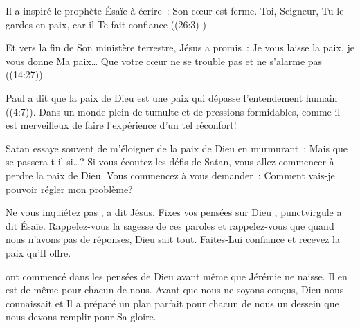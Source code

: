 Il a inspiré le prophète Ésaïe à écrire~: 
 \og Son cœur est ferme. Toi, Seigneur, Tu le gardes en paix,
 car il Te fait confiance \fg{}
 ((26:3) \BFC) 


Et vers la fin de Son ministère terrestre, Jésus a promis~:
 \og Je vous laisse la paix, je vous donne Ma paix\dots{}
 Que votre cœur ne se trouble pas et ne s'alarme pas \fg{}
 ((14:27)). 

Paul a dit que la paix de Dieu est une paix qui dépasse l'entendement humain
 ((4:7)).
 Dans un monde plein de tumulte et de pressions formidables,
 comme il est merveilleux de faire l'expérience d'un tel réconfort! 

Satan essaye souvent de m'éloigner de la paix de Dieu en murmurant~:
 \og Mais que se passera-t-il si\dots{}? \fg{} 
 Si vous écoutez les défis de Satan, vous allez commencer
 à perdre la paix de Dieu. Vous commencez à vous demander~:
 \og Comment vais-je pouvoir régler mon problème? \fg{} 

\og Ne vous inquiétez pas \fg{}, 
 a dit Jésus.
 \og Fixes vos 
 pensées sur Dieu \fg{}, punct{virgule}
 a dit Ésaïe.
 Rappelez-vous la sagesse de ces paroles et rappelez-vous que
 quand nous n'avons pas de réponses, Dieu sait tout.
 Faites-Lui confiance et recevez la paix qu'Il offre.

\dvrule







 ont commencé
 dans les pensées de Dieu avant même que Jérémie ne naisse.
 Il en est de même pour chacun de nous. Avant que nous ne soyons conçus,
 Dieu nous connaissait et Il a préparé un plan parfait pour chacun de nous
 \ocadr un dessein que nous devons remplir pour Sa gloire. 

